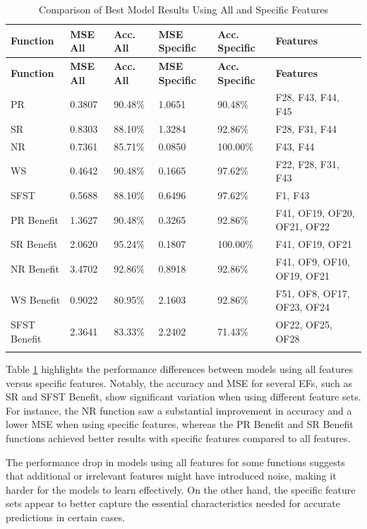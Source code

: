 \documentclass[12pt,letterpaper]{article}
\begin{document}
\begin{longtable}{|p{3cm}|p{2cm}|p{2cm}|p{2cm}|p{2cm}|p{3cm}|}
\hline
\textbf{Function} & \textbf{MSE All} & \textbf{Acc. All} & \textbf{MSE Specific} & \textbf{Acc. Specific} & \textbf{Features} \\ \hline
\endfirsthead
\hline
\textbf{Function} & \textbf{MSE All} & \textbf{Acc. All} & \textbf{MSE Specific} & \textbf{Acc. Specific} & \textbf{Features} \\ \hline
\endhead

PR & 0.3807 & 90.48\% & 1.0651 & 90.48\% & F28, F43, F44, F45 \\ \hline
SR & 0.8303 & 88.10\% & 1.3284 & 92.86\% & F28, F31, F44 \\ \hline
NR & 0.7361 & 85.71\% & 0.0850 & 100.00\% & F43, F44 \\ \hline
WS & 0.4642 & 90.48\% & 0.1665 & 97.62\% & F22, F28, F31, F43 \\ \hline
SFST & 0.5688 & 88.10\% & 0.6496 & 97.62\% & F1, F43 \\ \hline
PR Benefit & 1.3627 & 90.48\% & 0.3265 & 92.86\% & F41, OF19, OF20, OF21, OF22 \\ \hline
SR Benefit & 2.0620 & 95.24\% & 0.1807 & 100.00\% & F41, OF19, OF21 \\ \hline
NR Benefit & 3.4702 & 92.86\% & 0.8918 & 92.86\% & F41, OF9, OF10, OF19, OF21 \\ \hline
WS Benefit & 0.9022 & 80.95\% & 2.1603 & 92.86\% & F51, OF8, OF17, OF23, OF24 \\ \hline
SFST Benefit & 2.3641 & 83.33\% & 2.2402 & 71.43\% & OF22, OF25, OF28 \\ \hline
\caption{Comparison of Best Model Results Using All and Specific Features}
\label{tab_combined:featred_comparison}
\end{longtable}

Table \ref{tab_combined:featred_comparison} highlights the performance differences between models using all features versus specific features. Notably, the accuracy and MSE for several \acp{EF}, such as \ac{SR} and \ac{SFST} Benefit, show significant variation when using different feature sets. For instance, the \ac{NR} function saw a substantial improvement in accuracy and a lower MSE when using specific features, whereas the \ac{PR} Benefit and \ac{SR} Benefit functions achieved better results with specific features compared to all features.

The performance drop in models using all features for some functions suggests that additional or irrelevant features might have introduced noise, making it harder for the models to learn effectively. On the other hand, the specific feature sets appear to better capture the essential characteristics needed for accurate predictions in certain cases.
\end{document}
